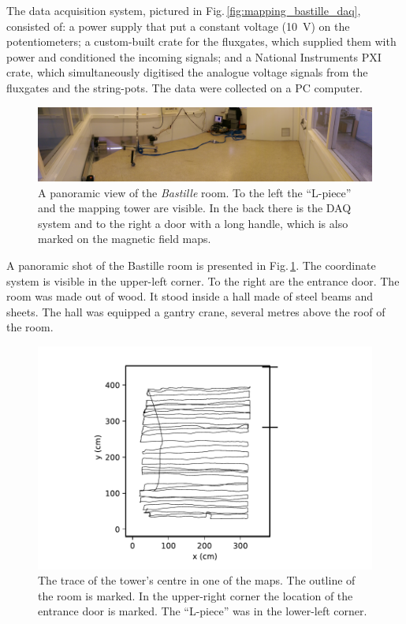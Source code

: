 The data acquisition system, pictured in Fig.\,\ref{fig:mapping_bastille_daq}, consisted of: a power supply that put a constant voltage (\SI{10}{\volt}) on the potentiometers; a custom-built crate for the fluxgates, which supplied them with power and conditioned the incoming signals; and a National Instruments PXI crate, which simultaneously digitised the analogue voltage signals from the fluxgates and the string-pots. The data were collected on a PC computer.

\begin{figure}
  \centering
  \includegraphics[width=\linewidth]{gfx/mapping/lpsc/bastille_panorama.jpeg}
  \caption{A panoramic view of the \emph{Bastille} room. To the left the ``L-piece'' and the mapping tower are visible. In the back there is the DAQ system and to the right a door with a long handle, which is also marked on the magnetic field maps.}\label{fig:mapping_bastille_panorama}
\end{figure}

A panoramic shot of the Bastille room is presented in Fig.\,\ref{fig:mapping_bastille_panorama}. The coordinate system is visible in the upper-left corner. To the right are the entrance door.
The room was made out of wood. It stood inside a hall made of steel beams and sheets. 
The hall was equipped a gantry crane, several metres above the roof of the room.

\begin{figure}
  \centering
  \includegraphics[width=0.5\linewidth]{gfx/mapping/lpsc/bastille_crane_away_rep_track_crop.pdf}
  \caption{The trace of the tower's centre in one of the maps. The outline of the room is marked. In the upper-right corner the location of the entrance door is marked. The ``L-piece'' was in the lower-left corner.}\label{fig:mapping_bastille_track}
\end{figure}

